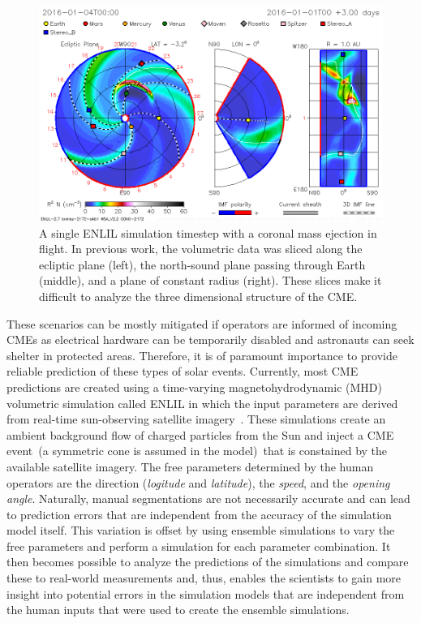 \begin{figure}
\includegraphics[width=\textwidth]{figures/contributions/spaceweather/enlil.png}
\caption{A single ENLIL simulation timestep with a coronal mass ejection in flight.  In previous work, the volumetric data was sliced along the ecliptic plane (left), the north-sound plane passing through Earth (middle), and a plane of constant radius (right).  These slices make it difficult to analyze the three dimensional structure of the CME.}
\label{contributions:astro:spaceweather:enlil}
\end{figure}

These scenarios can be mostly mitigated if operators are informed of incoming CMEs as electrical hardware can be temporarily disabled and astronauts can seek shelter in protected areas.  Therefore, it is of paramount importance to provide reliable prediction of these types of solar events.  Currently, most CME predictions are created using a time-varying magnetohydrodynamic (MHD) volumetric simulation called ENLIL in which the input parameters are derived from real-time sun-observing satellite imagery~\cite{mays2015ensemble}.  These simulations create an ambient background flow of charged particles from the Sun and inject a CME event~(a symmetric cone is assumed in the model)~that is constained by the available satellite imagery.  The free parameters determined by the human operators are the direction (\emph{logitude} and \emph{latitude}), the \emph{speed}, and the \emph{opening angle}.  Naturally, manual segmentations are not necessarily accurate and can lead to prediction errors that are independent from the accuracy of the simulation model itself.  This variation is offset by using ensemble simulations to vary the free parameters and perform a simulation for each parameter combination.  It then becomes possible to analyze the predictions of the simulations and compare these to real-world measurements and, thus, enables the scientists to gain more insight into potential errors in the simulation models that are independent from the human inputs that were used to create the ensemble simulations.

